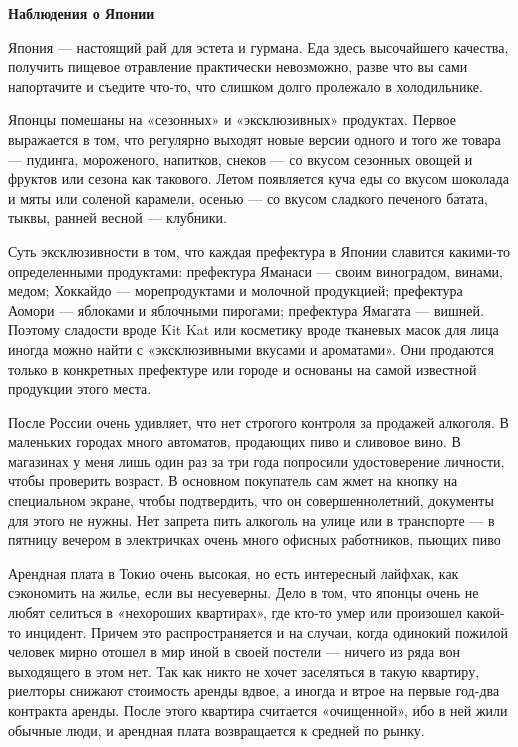 \newpage
\textbf{Наблюдения о Японии}

Япония — настоящий рай для эстета и гурмана. Еда здесь высочайшего качества, получить пищевое отравление практически невозможно, разве что вы сами напортачите и съедите что-то, что слишком долго пролежало в холодильнике.

Японцы помешаны на «сезонных» и «эксклюзивных» продуктах. Первое выражается в том, что регулярно выходят новые версии одного и того же товара — пудинга, мороженого, напитков, снеков — со вкусом сезонных овощей и фруктов или сезона как такового. Летом появляется куча еды со вкусом шоколада и мяты или соленой карамели, осенью — со вкусом сладкого печеного батата, тыквы, ранней весной — клубники.

Суть эксклюзивности в том, что каждая префектура в Японии славится какими-то определенными продуктами: префектура Яманаси — своим виноградом, винами, медом; Хоккайдо — морепродуктами и молочной продукцией; префектура Аомори — яблоками и яблочными пирогами; префектура Ямагата — вишней. Поэтому сладости вроде Kit Kat или косметику вроде тканевых масок для лица иногда можно найти с «эксклюзивными вкусами и ароматами». Они продаются только в конкретных префектуре или городе и основаны на самой известной продукции этого места.

\begin{fancyquotes}
    После России очень удивляет, что нет строгого контроля за продажей алкоголя. В маленьких городах много автоматов, продающих пиво и сливовое вино. В магазинах у меня лишь один раз за три года попросили удостоверение личности, чтобы проверить возраст. В основном покупатель сам жмет на кнопку на специальном экране, чтобы подтвердить, что он совершеннолетний, документы для этого не нужны. Нет запрета пить алкоголь на улице или в транспорте — в пятницу вечером в электричках очень много офисных работников, пьющих пиво
\end{fancyquotes}

Арендная плата в Токио очень высокая, но есть интересный лайфхак, как сэкономить на жилье, если вы несуеверны. Дело в том, что японцы очень не любят селиться в «нехороших квартирах», где кто-то умер или произошел какой-то инцидент. Причем это распространяется и на случаи, когда одинокий пожилой человек мирно отошел в мир иной в своей постели — ничего из ряда вон выходящего в этом нет. Так как никто не хочет заселяться в такую квартиру, риелторы снижают стоимость аренды вдвое, а иногда и втрое на первые год-два контракта аренды. После этого квартира считается «очищенной», ибо в ней жили обычные люди, и арендная плата возвращается к средней по рынку.

